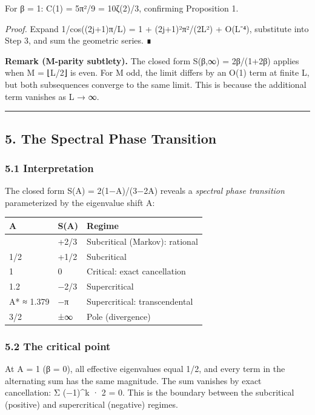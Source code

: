 \documentclass[
  11pt,
]{article}
\begin{document}
For β = 1: C(1) = 5π²/9 = 10ζ(2)/3, confirming Proposition 1.

\emph{Proof.} Expand 1/cos((2j+1)π/L) = 1 + (2j+1)²π²/(2L²) + O(L⁻⁴), substitute
into Step 3, and sum the geometric series. ∎

\textbf{Remark (M-parity subtlety).} The closed form S(β,∞) = 2β/(1+2β) applies
when M = ⌊L/2⌋ is even. For M odd, the limit differs by an O(1) term at finite
L, but both subsequences converge to the same limit. This is because the
additional term vanishes as L → ∞.

\begin{center}\rule{0.5\linewidth}{0.5pt}\end{center}

\newpage

\subsection{5. The Spectral Phase
Transition}\label{the-spectral-phase-transition}

\subsubsection{5.1 Interpretation}\label{interpretation}

The closed form S(A) = 2(1−A)/(3−2A) reveals a \emph{spectral phase transition}
parameterized by the eigenvalue shift A:

\begin{longtable}[]{@{}lll@{}}
\toprule\noalign{}
A & S(A) & Regime \\
\midrule\noalign{}
\endhead
\bottomrule\noalign{}
\endlastfoot
0 & +2/3 & Subcritical (Markov): rational \\
1/2 & +1/2 & Subcritical \\
1 & 0 & Critical: exact cancellation \\
1.2 & −2/3 & Supercritical \\
A* ≈ 1.379 & −π & Supercritical: transcendental \\
3/2 & ±∞ & Pole (divergence) \\
\end{longtable}

\subsubsection{5.2 The critical point}\label{the-critical-point}

At A = 1 (β = 0), all effective eigenvalues equal 1/2, and every term in the
alternating sum has the same magnitude. The sum vanishes by exact cancellation:
Σ (−1)\^{}k · 2 = 0. This is the boundary between the subcritical (positive) and
supercritical (negative) regimes.
\end{document}
